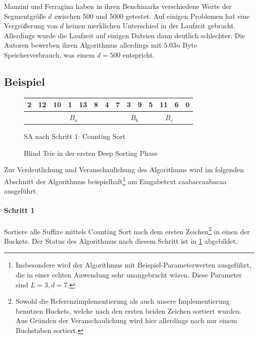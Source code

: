 Manzini und Ferragina haben in ihren Benchmarks verschiedene Werte der Segmentgröße $d$ zwischen 500 und 5000 getestet.
Auf einigen Problemen hat eine Vergrößerung von $d$ keinen merklichen Unterschied in der Laufzeit gebracht.
Allerdings wurde die Laufzeit auf einigen Dateien dann deutlich schlechter.
Die Autoren bewerben ihren Algorithmus allerdings mit $5.03n$ Byte Speicherverbrauch, was einem $d = 500$ entspricht.

\subsection{Beispiel}

\begin{figure}[!h]
\centering
\begin{tabular}{|c|c|c|c|c|c|c|c|c|c|c|c|c|c|}
\hline
2 & 12 & 10 & 1 & 13 & 8 & 4 & 7 & 3 & 9 & 5 & 11 & 6 & 0 \\
\hline
\multicolumn{8}{|c|}{$B_a$} & \multicolumn{2}{c|}{$B_b$} & \multicolumn{4}{c|}{$B_c$} \\
\hline
\end{tabular}
\caption{SA nach Schritt 1: Counting Sort}
\label{ds:beispiel1}
\end{figure}

\newcommand{\tnode}{\node[draw,circle]}
\newcommand{\trans}{\draw[-stealth]}
\begin{figure}[!h]
\centering
{}
\caption{Blind Trie in der ersten Deep Sorting Phase}
\label{ds:beispiel_bt1}
\end{figure}

Zur Verdeutlichung und Veranschaulichung des Algorithmus wird im folgenden Abschnitt der Algorithmus beispielhaft\footnote{Insbesondere wird der Algorithmus mit Beispiel-Parameterwerten ausgeführt, die in einer echten Anwendung sehr unangebracht wären. Diese Parameter sind $L = 3, d = 7$.} am Eingabetext \glqq caabaccaabacaa\grqq{} ausgeführt.

\paragraph{Schritt 1} Sortiere alle Suffixe mittels Counting Sort nach dem ersten Zeichen\footnote{Sowohl die Referenzimplementierung als auch unsere Implementierung benutzen Buckets, welche nach den ersten beiden Zeichen sortiert wurden.
Aus Gründen der Veranschaulichung wird hier allerdings nach nur einem Buchstaben sortiert.} in einen der Buckets.
Der Status des Algorithmus nach diesem Schritt ist in \cref{ds:beispiel1} abgebildet.

